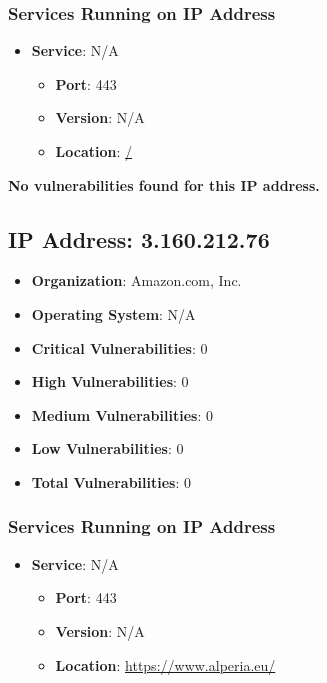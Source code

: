 \documentclass{article}
\begin{document}
\subsubsection*{Services Running on IP Address}

\begin{itemize}
    
        \item \textbf{Service}: N/A
        \begin{itemize}
            \item \textbf{Port}: 443
            \item \textbf{Version}:  N/A 
            \item \textbf{Location}: \href{ / }{ / }
        \end{itemize}
    
\end{itemize}


\textbf{No vulnerabilities found for this IP address.}




\clearpage



\subsection{IP Address: 3.160.212.76}

\begin{itemize}
    \item \textbf{Organization}: Amazon.com, Inc.
    \item \textbf{Operating System}:  N/A 
    \item \textbf{Critical Vulnerabilities}: 0
    \item \textbf{High Vulnerabilities}: 0
    \item \textbf{Medium Vulnerabilities}: 0
    \item \textbf{Low Vulnerabilities}: 0
    \item \textbf{Total Vulnerabilities}: 0
\end{itemize}

\subsubsection*{Services Running on IP Address}

\begin{itemize}
    
        \item \textbf{Service}: N/A
        \begin{itemize}
            \item \textbf{Port}: 443
            \item \textbf{Version}:  N/A 
            \item \textbf{Location}: \href{ https://www.alperia.eu/ }{ https://www.alperia.eu/ }
        \end{itemize}
    
\end{itemize}
\end{document}
